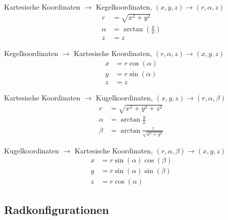 Kartesische Koordinaten $\rightarrow$ Kegelkoordinaten, $(x,y,z) \rightarrow (r,\alpha,z)$
\begin{align}
r &= \sqrt{x^2+y^2}\\
\alpha &= \arctan(\frac{y}{x})\\
z &= z
\end{align}

Kegelkoordinaten $\rightarrow$ Kartesische Koordinaten, $(r,\alpha,z) \rightarrow (x,y,z)$
\begin{align}
x &= r \cos(\alpha)\\
y &= r \sin(\alpha)\\
z &= z
\end{align}

Kartesische Koordinaten $\rightarrow$ Kugelkoordinaten, $(x,y,z) \rightarrow (r,\alpha,\beta)$
\begin{align}
    r &= \sqrt{x^2+y^2+z^2}\\
    \alpha &= \arctan{\frac{y}{x}}\\
    \beta &= \arctan{\frac{z}{\sqrt{x^2+y^2}}}
\end{align}

Kugelkoordinaten $\rightarrow$ Kartesische Koordinaten, $(r,\alpha,\beta) \rightarrow (x,y,z)$
\begin{align}
    x &= r \sin(\alpha)\cos(\beta)\\
    y &= r \sin(\alpha)\sin(\beta)\\
    z &= r \cos(\alpha)
\end{align}

\subsection{Radkonfigurationen}

